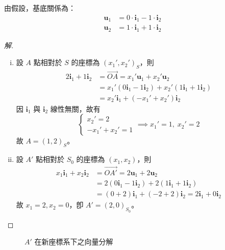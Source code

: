 由假設，基底關係為：
\begin{align*}
\mathbf{u}_1 &= 0 \cdot \mathbf{i}_1 - 1 \cdot \mathbf{i}_2 \\
\mathbf{u}_2 &= 1 \cdot \mathbf{i}_1 + 1 \cdot \mathbf{i}_2
\end{align*}
\begin{proof}[解]
\begin{enumerate}[(i)]
  \item 設 $A$ 點相對於 $S$ 的座標為 $(x_1', x_2')_S$，則
  \begin{align*}
  2\mathbf{i}_1 + 1\mathbf{i}_2 &= \vec{OA} = x_1' \mathbf{u}_1 + x_2' \mathbf{u}_2 \\
  &= x_1'(0\mathbf{i}_1 - 1\mathbf{i}_2) + x_2'(1\mathbf{i}_1 + 1\mathbf{i}_2) \\
  &= x_2'\mathbf{i}_1 + (-x_1' + x_2')\mathbf{i}_2
  \end{align*}
  因 $\mathbf{i}_1$ 與 $\mathbf{i}_2$ 線性無關，故有
  \[ \begin{cases} x_2' = 2 \\ -x_1' + x_2' = 1 \end{cases} \implies x_1' = 1, \; x_2' = 2 \]
  故 $A = (1, 2)_S$。
  \item 設 $A'$ 點相對於 $S_0$ 的座標為 $(x_1, x_2)$，則
  \begin{align*}
  x_1\mathbf{i}_1 + x_2\mathbf{i}_2 &= \vec{OA'} = 2\mathbf{u}_1 + 2\mathbf{u}_2 \\
  &= 2(0\mathbf{i}_1 - 1\mathbf{i}_2) + 2(1\mathbf{i}_1 + 1\mathbf{i}_2) \\
  &= (0 + 2)\mathbf{i}_1 + (-2 + 2)\mathbf{i}_2 = 2\mathbf{i}_1 + 0\mathbf{i}_2
  \end{align*}
  故 $x_1 = 2, x_2 = 0$，卽 $A' = (2, 0)_{S_0}$。
\end{enumerate}
\end{proof}

\begin{figure}[H]
\centering
{}
\caption{$A'$ 在新座標系下之向量分解}
\label{fig:b4-2-6}
\end{figure}

